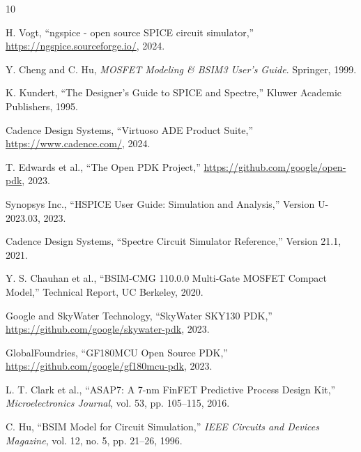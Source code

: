 \documentclass[conference]{IEEEtran}
\begin{document}

\begin{thebibliography}{10}

H. Vogt, ``ngspice - open source SPICE circuit simulator,'' 
\url{https://ngspice.sourceforge.io/}, 2024.

Y. Cheng and C. Hu, \textit{MOSFET Modeling \& BSIM3 User's Guide}. 
Springer, 1999.

K. Kundert, ``The Designer's Guide to SPICE and Spectre,'' 
Kluwer Academic Publishers, 1995.

Cadence Design Systems, ``Virtuoso ADE Product Suite,''
\url{https://www.cadence.com/}, 2024.

T. Edwards et al., ``The Open PDK Project,''
\url{https://github.com/google/open-pdk}, 2023.

Synopsys Inc., ``HSPICE User Guide: Simulation and Analysis,''
Version U-2023.03, 2023.

Cadence Design Systems, ``Spectre Circuit Simulator Reference,''
Version 21.1, 2021.

Y. S. Chauhan et al., ``BSIM-CMG 110.0.0 Multi-Gate MOSFET Compact Model,''
Technical Report, UC Berkeley, 2020.

Google and SkyWater Technology, ``SkyWater SKY130 PDK,''
\url{https://github.com/google/skywater-pdk}, 2023.

GlobalFoundries, ``GF180MCU Open Source PDK,''
\url{https://github.com/google/gf180mcu-pdk}, 2023.

L. T. Clark et al., ``ASAP7: A 7-nm FinFET Predictive Process Design Kit,''
\textit{Microelectronics Journal}, vol. 53, pp. 105--115, 2016.

C. Hu, ``BSIM Model for Circuit Simulation,'' 
\textit{IEEE Circuits and Devices Magazine}, vol. 12, no. 5, pp. 21--26, 1996.

\end{thebibliography}
\end{document}
